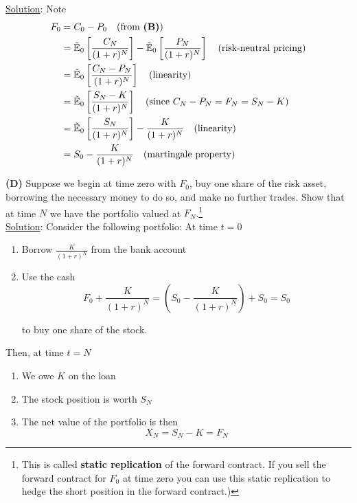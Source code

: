 \documentclass[12pt]{article}
\newcommand{\E}{\mathbb E}
\begin{document}
\underline{Solution}: Note
\begin{align*}
	F_0 &= C_0 - P_0 \quad \text{(from {\bf (B)})} \\
	&= \tilde{\E}_0 \left[ \frac{ C_N }{(1 + r)^N} \right] - \tilde{\E}_0 \left[ \frac{ P_N }{(1 + r)^N} \right] \quad \text{(risk-neutral pricing)} \\
	&= \tilde{\E}_0 \left[ \frac{ C_N - P_N }{(1 + r)^N} \right] \quad \text{(linearity)} \\
	&= \tilde{\E}_0 \left[ \frac{ S_N - K }{(1 + r)^N} \right] \quad \text{(since } C_N - P_N = F_N = S_N - K) \\
	&= \tilde{\E}_0 \left[ \frac{ S_N }{(1 + r)^N} \right] - \frac{K}{(1 + r)^N} \quad \text{(linearity)} \\
	&= S_0 - \frac{K}{(1 + r)^N} \quad \text{(martingale property)}
\end{align*}

{\bf (D)} Suppose we begin at time zero with $F_0$, buy one share of the risk asset, borrowing the necessary money to do so, and make no further trades. Show that at time $N$ we have the portfolio valued at $F_N$.\footnote{This is called {\bf static replication} of the forward contract. If you sell the forward contract for $F_0$ at time zero you can use this static replication to hedge the short position in the forward contract.)} \\

\underline{Solution}: Consider the following portfolio: At time $t = 0$
\begin{enumerate}
	\item Borrow $\frac{K}{(1 + r)^N}$ from the bank account
	\item Use the cash
	\begin{equation*}
		F_0 + \frac{K}{(1 + r)^N} = \left(S_0 - \frac{K}{(1 + r)^N}\right) + S_0 = S_0
	\end{equation*}
	
	to buy one share of the stock.
\end{enumerate}

Then, at time $t = N$
\begin{enumerate}
	\item We owe $K$ on the loan
	\item The stock position is worth $S_N$
	\item The net value of the portfolio is then
	\begin{equation*}
		X_N = S_N - K = F_N
	\end{equation*}
\end{enumerate}
\end{document}
